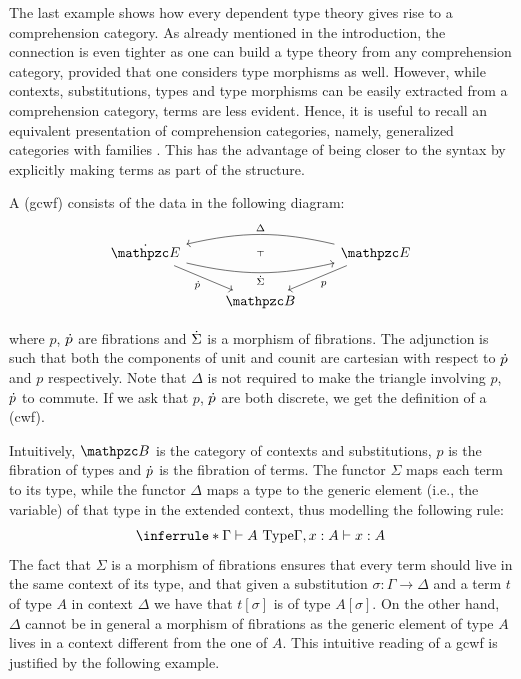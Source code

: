 \documentclass{lmcs} %
\theoremstyle{plain}\newtheorem{satz}[thm]{Satz} %
\begin{document}
The last example shows how every dependent type theory gives rise to a comprehension category. 
As already mentioned in the introduction, 
the connection is even tighter as one can build a type theory from any comprehension category, provided that one considers type morphisms as well. 
% 
However, while contexts, substitutions, types and type morphisms can be easily extracted from a comprehension category, 
terms are less evident. 
Hence, it is useful to recall an equivalent presentation of comprehension categories, namely, generalized categories with families \cite[Def. 3.15]{emmenegger}. This has the advantage of being closer to the syntax by explicitly making terms as part of the structure. 

			\begin{defi}
				A  (gcwf) consists of the data in the following diagram:
				\[\begin{tikzcd}
					{\tcat{\ct{E}}} && {\ct{E}} \\
					& {\ct{B}}
					\arrow[""{name=0, anchor=center, inner sep=0}, "\tsigma"', bend right=3ex, from=1-1, to=1-3]
					\arrow["{\tfib{p}}"', from=1-1, to=2-2]
					\arrow[""{name=1, anchor=center, inner sep=0}, "\Delta"', bend right=3ex, from=1-3, to=1-1]
					\arrow["p", from=1-3, to=2-2]
					\arrow["\dashv"{anchor=center, rotate=90}, draw=none, from=0, to=1]
				\end{tikzcd}\]
				
				where $p$, $\dot{p}$ are fibrations and $\dot{\Sigma}$ is a morphism of fibrations. The adjunction is such that both the components of unit and counit are cartesian with respect to $\dot{p}$ and $p$ respectively. Note that $\Delta$ is not required to make the triangle involving $p$, $\dot{p}$ to commute. If we ask that $p$, $\dot{p}$ are both discrete, we get the definition of a  (cwf).
			\end{defi}

Intuitively, 
$\ct{B}$ is the category of contexts and substitutions, 
$p$ is the fibration of types and 
$\dot{p}$ is the fibration of terms. 
The functor $\Sigma$ maps each term to its type, while the functor $\Delta$ 
maps a type to the generic element (i.e., the variable) of that type in the extended context, thus modelling the following rule: 
\[\inferrule*{\Gamma\vdash A\ \type}{\Gamma, \var{A}:A\vdash \var{A}:A}\]
The fact that $\Sigma$ is a morphism of fibrations ensures that 
every term should live in the same context of its type, and that given a substitution $\sigma:\Gamma\to \Delta$ and a term $t$ of type $A$ in context $\Delta$ we have that $t[\sigma]$ is of type $A[\sigma]$.
On the other hand, $\Delta$ cannot be in general a morphism of fibrations as the generic element of type $A$ lives in a context different from the one of $A$. 
This intuitive reading of a gcwf is justified by the following example. 
\end{document}
